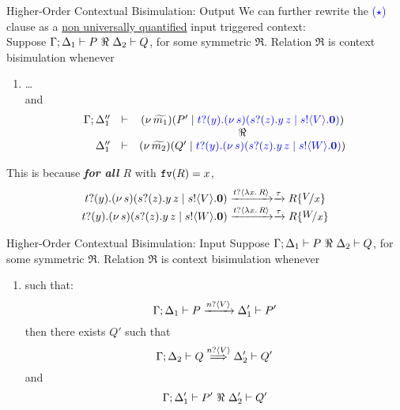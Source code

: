 \documentclass{beamer}
\newcommand{\prcolor}[1]{{\color{blue} #1}}
\begin{document}
	\begin{frame}{Higher-Order Contextual Bisimulation: Output}
		We can further rewrite the \textcolor{blue}{($\star$)} clause as a \underline{non universally quantified} input triggered context:
		\\[2mm]

		Suppose $\Gamma; \Delta_1 \proves P\ \Re\ \Delta_2 \proves Q$, for some symmetric $\Re$. Relation $\Re$ is
		context bisimulation whenever
		\begin{enumerate}[$(\star)$]
			\item
				\dots\\
				and
				\[
					\begin{array}{rcc}
						\Gamma; \Delta_1'' &\proves& \newsp{\widetilde{m_1}}{P' \Par \prcolor{\binp{t}{y}\newsp{s}{\binp{s}{z} \appl{y}{z} \Par \bout{s}{V} \inact}}}
						\\
						&& \Re
						\\
						\Delta_1'' &\proves& \newsp{\widetilde{m_2}}{Q' \Par \prcolor{\binp{t}{y}\newsp{s}{\binp{s}{z} \appl{y}{z} \Par \bout{s}{W} \inact}}}
					\end{array}
				\]
		\end{enumerate}

		This is because \emph{\textbf{for all} $R$} with $\mathtt{fv}(R)=x$, 
		\[
			\begin{array}{c}
			\binp{t}{y}\newsp{s}{\binp{s}{z} \appl{y}{z} \Par \bout{s}{V} \inact}
			\by{\bactinp{t}{\abs{x}{R}}} \by{\tau}
			R \subst{V}{x}
			\\
			\binp{t}{y}\newsp{s}{\binp{s}{z} \appl{y}{z} \Par \bout{s}{W} \inact}
			\by{\bactinp{t}{\abs{x}{R}}} \by{\tau}
			R \subst{W}{x}
			\end{array}
		\]
	\end{frame}

	\begin{frame}{Higher-Order Contextual Bisimulation: Input}
		Suppose $\Gamma; \Delta_1 \proves P\ \Re\ \Delta_2 \proves Q$, for some symmetric $\Re$. Relation $\Re$ is
		context bisimulation whenever
		\begin{enumerate}[$(\bullet)$]
			\item	{} such that:
				\[
					\Gamma; \Delta_1 \vdash P \xrightarrow{n ? \langle V \rangle} \Delta_1' \vdash P'
				\]
				then there exists $Q'$ such that
				\[
					\Gamma; \Delta_2 \vdash Q \stackrel{n ? \langle V \rangle}{\Longrightarrow} \Delta_2' \vdash Q'
				\]
				and
				\[
					\Gamma; \Delta_1' \vdash P'\ \Re\ \Delta_2' \vdash Q'
				\]
		\end{enumerate}
	\end{frame}
\end{document}
